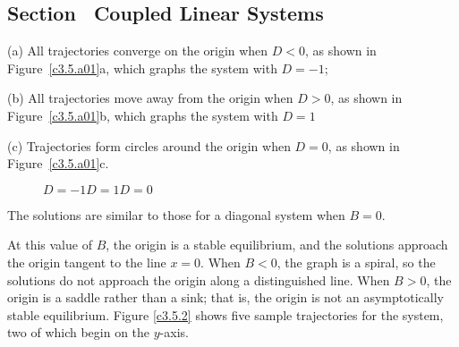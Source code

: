 \documentclass{ximera}
\begin{document}
\begin{figure}[htb]
			\centerline{%
			}
\end{figure}



\newpage
\subsection*{Section~\protect{\ref{s:3.5}} Coupled Linear Systems}

(a) All trajectories converge on the origin when $D < 0$, as shown in
Figure~\ref{c3.5.a01}a, which graphs the system with $D =- 1$;

(b) All trajectories move away from the origin when $D > 0$, as shown in
Figure~\ref{c3.5.a01}b, which graphs the system with $D = 1$

(c) Trajectories form circles around the origin when $D = 0$, as shown in
Figure~\ref{c3.5.a01}c.

\begin{figure}[htb]
                       \centerline{%
                       }
	\centerline{$D = -1$\hspace{1.4in}$D = 1$\hspace{1.4in}$D = 0$}
\end{figure}

\ans The solutions are similar to those for a diagonal system when
$B = 0$.

\soln At this value of $B$, the origin is a stable equilibrium, and the
solutions approach the origin tangent to the line $x = 0$.  When $B < 0$,
the graph is a spiral, so the solutions do not approach the origin along
a distinguished line.  When $B > 0$, the origin is a saddle rather
than a sink; that is, the origin is not an asymptotically stable
equilibrium.  Figure \ref{c3.5.2} shows five sample trajectories
for the system, two of which begin on the $y$-axis.

\begin{figure}[htb]
                       \centerline{%
                       }
\end{figure}
\end{document}
